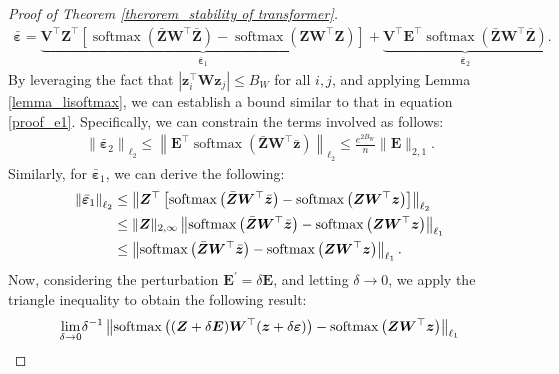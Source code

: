 \begin{proof}[Proof of Theorem \ref{therorem_stability of transformer}]
\begin{align}
\boldsymbol{\bar{\varepsilon}}=\underbrace{\boldsymbol{V}^{\top} \boldsymbol{Z}^{\top}\left[\operatorname{softmax}\left(\bar{\boldsymbol{Z}} \boldsymbol{W}^{\top} \bar{\boldsymbol{Z}}\right)-\operatorname{softmax}\left(\boldsymbol{Z} \boldsymbol{W}^{\top} \boldsymbol{Z}\right)\right]}_{\boldsymbol{\bar{\varepsilon}}_1}+\underbrace{\boldsymbol{V}^{\top} \boldsymbol{E}^{\top} \operatorname{softmax}\left(\bar{\boldsymbol{Z}} \boldsymbol{W}^{\top} \bar{\boldsymbol{Z}}\right)}_{\boldsymbol{\bar{\varepsilon}}_2}.
\end{align}
By leveraging the fact that $\left|\boldsymbol{z}_i^{\top} \boldsymbol{W} \boldsymbol{z}_j\right| \leq B_W$ for all $i, j$, and applying Lemma \ref{lemma_lisoftmax}, we can establish a bound similar to that in equation \ref{proof_e1}. Specifically, we can constrain the terms involved as follows:
\begin{align}
    \left\|\boldsymbol{\bar{\varepsilon}}_2\right\|_{\ell_2} \leq\left\|\boldsymbol{E}^{\top} \operatorname{softmax}\left(\bar{\boldsymbol{Z}} \boldsymbol{W}^{\top} \bar{\boldsymbol{z}}\right)\right\|_{\ell_2} \leq \frac{e^{2 B_W}}{n}\|\boldsymbol{E}\|_{2,1} .
\end{align}
Similarly, for $\bar{\boldsymbol{\varepsilon}}_1$, we can derive the following:
\begin{align}
\left\|\bar{\boldsymbol{\varepsilon}}_1\right\|_{\ell_2} & \leq\left\|\boldsymbol{Z}^{\top}\left[\operatorname{softmax}\left(\bar{\boldsymbol{Z}} \boldsymbol{W}^{\top} \bar{\boldsymbol{z}}\right)-\operatorname{softmax}\left(\boldsymbol{Z} \boldsymbol{W}^{\top} \boldsymbol{z}\right)\right]\right\|_{\ell_2} \notag\\
& \leq\|\boldsymbol{Z}\|_{2, \infty}\left\|\operatorname{softmax}\left(\bar{\boldsymbol{Z}} \boldsymbol{W}^{\top} \bar{\boldsymbol{z}}\right)-\operatorname{softmax}\left(\boldsymbol{Z} \boldsymbol{W}^{\top} \boldsymbol{z}\right)\right\|_{\ell_1} \notag\\
& \leq\left\|\operatorname{softmax}\left(\bar{\boldsymbol{Z}} \boldsymbol{W}^{\top} \bar{\boldsymbol{z}}\right)-\operatorname{softmax}\left(\boldsymbol{Z} \boldsymbol{W}^{\top} \boldsymbol{z}\right)\right\|_{\ell_1} .\notag
\end{align}
Now, considering the perturbation $\boldsymbol{E}^{\prime}=\delta \boldsymbol{E}$, and letting $\delta \rightarrow 0$, we apply the triangle inequality to obtain the following result:
\begin{align}
 \lim _{\delta \rightarrow 0} &\delta^{-1}\left\|\operatorname{softmax}\left((\boldsymbol{Z}+\delta \boldsymbol{E}) \boldsymbol{W}^{\top}(\boldsymbol{z}+\delta \boldsymbol{\varepsilon})\right)-\operatorname{softmax}\left(\boldsymbol{Z} \boldsymbol{W}^{\top} \boldsymbol{z}\right)\right\|_{\ell_1} \notag \\

\end{align}
\end{proof}
